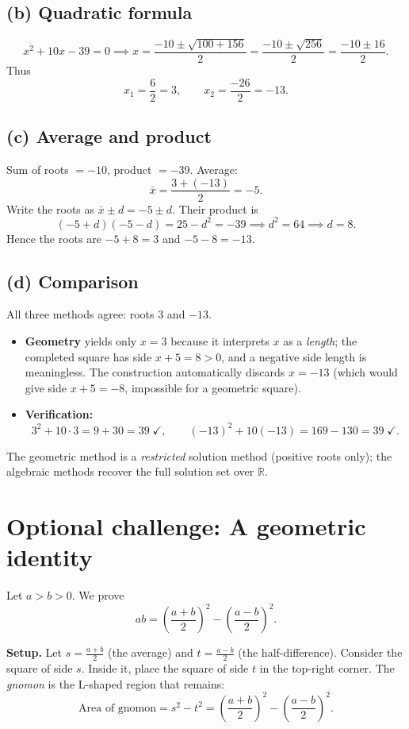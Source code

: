 \documentclass[11pt]{article}
\begin{document}
	\subsection*{(b) Quadratic formula}
	\[
	x^2 + 10x - 39 = 0 \implies x = \frac{-10 \pm \sqrt{100 + 156}}{2} = \frac{-10 \pm \sqrt{256}}{2} = \frac{-10 \pm 16}{2}.
	\]
	Thus
	\[
	x_1 = \frac{6}{2} = 3,\qquad x_2 = \frac{-26}{2} = -13.
	\]
	
	\subsection*{(c) Average and product}
	Sum of roots $= -10$, product $= -39$. Average:
	\[
	\bar{x} = \frac{3 + (-13)}{2} = -5.
	\]
	Write the roots as $\bar{x} \pm d = -5 \pm d$. Their product is
	\[
	(-5+d)(-5-d) = 25 - d^2 = -39 \implies d^2 = 64 \implies d = 8.
	\]
	Hence the roots are $-5 + 8 = 3$ and $-5 - 8 = -13$.
	
	\subsection*{(d) Comparison}
	All three methods agree: roots $3$ and $-13$.
	
	\begin{itemize}
		\item \textbf{Geometry} yields only $x = 3$ because it interprets $x$ as a \emph{length}; the completed square has side $x+5 = 8 > 0$, and a negative side length is meaningless. The construction automatically discards $x = -13$ (which would give side $x + 5 = -8$, impossible for a geometric square).
		\item \textbf{Verification:}
		\[
		3^2 + 10\cdot 3 = 9 + 30 = 39 \;\checkmark,\qquad
		(-13)^2 + 10(-13) = 169 - 130 = 39 \;\checkmark.
		\]
	\end{itemize}
	The geometric method is a \emph{restricted} solution method (positive roots only); the algebraic methods recover the full solution set over $\mathbb{R}$.
	
	\section*{Optional challenge: A geometric identity}
	
	\noindent Let $a > b > 0$. We prove
	\[
	ab = \left(\frac{a+b}{2}\right)^2 - \left(\frac{a-b}{2}\right)^2.
	\]
	
	\noindent\textbf{Setup.} Let $s = \frac{a+b}{2}$ (the average) and $t = \frac{a-b}{2}$ (the half-difference). Consider the square of side $s$. Inside it, place the square of side $t$ in the top-right corner. The \emph{gnomon} is the L-shaped region that remains:
	\[
	\text{Area of gnomon} = s^2 - t^2 = \left(\frac{a+b}{2}\right)^2 - \left(\frac{a-b}{2}\right)^2.
	\]
	
\end{document}
